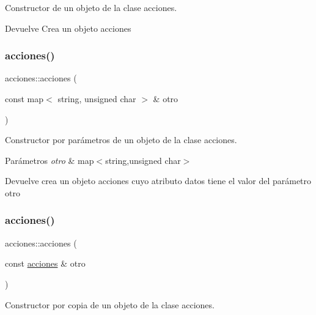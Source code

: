 Constructor de un objeto de la clase acciones. 

\begin{DoxyReturn}{Devuelve}
Crea un objeto acciones 
\end{DoxyReturn}
\mbox{\label{classacciones_a48c692cc6783fc3b06ab3dd58f13c17d}} 
\subsubsection{\texorpdfstring{acciones()}{acciones()}\hspace{0.1cm}{\footnotesize\ttfamily [2/3]}}
{\footnotesize\ttfamily acciones\+::acciones (\begin{DoxyParamCaption}\item[{const map$<$ string, unsigned char $>$ \&}]{otro }\end{DoxyParamCaption})}



Constructor por parámetros de un objeto de la clase acciones. 


\begin{DoxyParams}{Parámetros}
{\em otro} & map$<$string,unsigned char$>$ \\
\hline
\end{DoxyParams}
\begin{DoxyReturn}{Devuelve}
crea un objeto acciones cuyo atributo datos tiene el valor del parámetro otro 
\end{DoxyReturn}
\mbox{\label{classacciones_a70cd0d32a95500c4d8d09f3baef1e9a2}} 
\subsubsection{\texorpdfstring{acciones()}{acciones()}\hspace{0.1cm}{\footnotesize\ttfamily [3/3]}}
{\footnotesize\ttfamily acciones\+::acciones (\begin{DoxyParamCaption}\item[{const \hyperlink{classacciones}{acciones} \&}]{otro }\end{DoxyParamCaption})}



Constructor por copia de un objeto de la clase acciones. 


